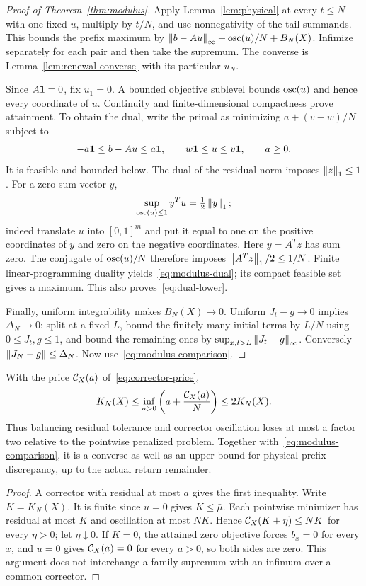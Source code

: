 \begin{proof}[Proof of Theorem~\ref{thm:modulus}]
Apply Lemma~\ref{lem:physical} at every $t\le N$ with one fixed $u$, multiply by $t/N$, and use nonnegativity of the tail summands. This bounds the prefix maximum by
$\left\lVert b-Au\right\rVert_\infty+\operatorname{osc}(u)/N+B_N(X)$.
Infimize separately for each pair and then take the supremum. The converse is Lemma~\ref{lem:renewal-converse} with its particular $u_N$.

Since $A\mathbf 1=0$, fix $u_1=0$. A bounded objective sublevel bounds $\operatorname{osc}(u)$ and hence every coordinate of $u$. Continuity and finite-dimensional compactness prove attainment. To obtain the dual, write the primal as minimizing $a+(v-w)/N$ subject to
\[
 -a\mathbf 1\le b-Au\le a\mathbf 1,\qquad
 w\mathbf 1\le u\le v\mathbf 1,\qquad a\ge0.
\]
It is feasible and bounded below. The dual of the residual norm imposes $\left\lVert z\right\rVert_1\le1$. For a zero-sum vector $y$,
\[
 \sup_{\operatorname{osc}(u)\le1}y^Tu=\tfrac12\left\lVert y\right\rVert_1;
\]
indeed translate $u$ into $[0,1]^m$ and put it equal to one on the positive coordinates of $y$ and zero on the negative coordinates. Here $y=A^Tz$ has sum zero. The conjugate of $\operatorname{osc}(u)/N$ therefore imposes $\left\lVert A^Tz\right\rVert_1/2\le1/N$. Finite linear-programming duality yields~\eqref{eq:modulus-dual}; its compact feasible set gives a maximum. This also proves~\eqref{eq:dual-lower}.

Finally, uniform integrability makes $B_N(X)\to0$. Uniform $J_t-g\to0$ implies $\Delta_N\to0$: split at a fixed $L$, bound the finitely many initial terms by $L/N$ using $0\le J_t,g\le1$, and bound the remaining ones by $\sup_{x,t>L}\left\lVert J_t-g\right\rVert_\infty$. Conversely $\left\lVert J_N-g\right\rVert\le\Delta_N$. Now use~\eqref{eq:modulus-comparison}.
\end{proof}

\begin{corollary}\label{cor:balanced-price}
With the price $\mathcal C_X(a)$ of~\eqref{eq:corrector-price},
\begin{equation}\label{eq:balanced-price}
 K_N(X)\le\inf_{a>0}\left(a+\frac{\mathcal C_X(a)}N\right)\le2K_N(X).
\end{equation}
Thus balancing residual tolerance and corrector oscillation loses at most a factor two relative to the pointwise penalized problem. Together with~\eqref{eq:modulus-comparison}, it is a converse as well as an upper bound for physical prefix discrepancy, up to the actual return remainder.
\end{corollary}
\begin{proof}
A corrector with residual at most $a$ gives the first inequality. Write $K=K_N(X)$. It is finite since $u=0$ gives $K\le\bar\mu$. Each pointwise minimizer has residual at most $K$ and oscillation at most $NK$. Hence $\mathcal C_X(K+\eta)\le NK$ for every $\eta>0$; let $\eta\downarrow0$. If $K=0$, the attained zero objective forces $b_x=0$ for every $x$, and $u=0$ gives $\mathcal C_X(a)=0$ for every $a>0$, so both sides are zero. This argument does not interchange a family supremum with an infimum over a common corrector.
\end{proof}

